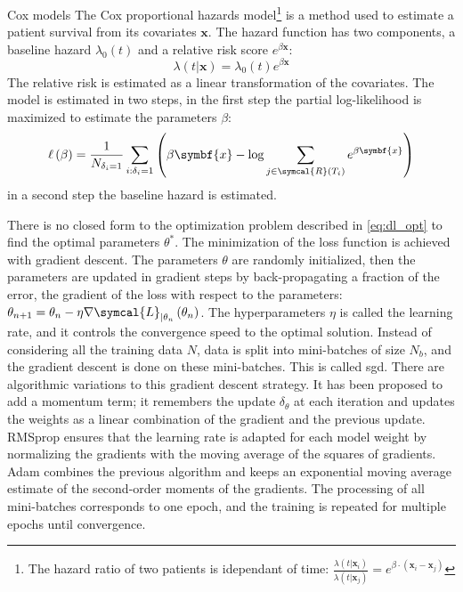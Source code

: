 \documentclass[../main.tex]{subfiles}
\begin{document}
		\begin{mybox}[label={box:cox}]{Cox models}
			The Cox proportional hazards model\footnote{The hazard ratio of two patients is idependant of time: \(\frac{\lambda(t | \symbf{x}_{i})}{\lambda(t | \symbf{x}_{j})} = e^{\beta\cdot \left(\symbf{x}_{i} - \symbf{x}_{j}\right)}\)} is a method used to estimate a patient survival from its covariates \(\symbf{x}\).
			The hazard function has two components, a baseline hazard \(\lambda_0(t)\) and a relative risk score \(e^{\beta \symbf{x}}\):
			\[\lambda(t | \symbf{x}) = \lambda_0(t) e^{\beta \symbf{x}}\]
			The relative risk is estimated as a linear transformation of the covariates.
			The model is estimated in two steps, in the first step the partial log-likelihood is maximized to estimate the parameters \(\beta\):
			\[\ell\left(\beta\right) = \frac{1}{N_{\delta_i = 1}} \sum_{i:\delta_i=1} \left(\beta \symbf{x} - \log \sum_{j \in \symcal{R}(T_i)}e^{\beta \symbf{x}} \right)\]
			in a second step the baseline hazard is estimated.
		\end{mybox}

		There is no closed form to the optimization problem described in \cref{eq:dl_opt} to find the optimal parameters \(\theta^{*}\).
		The minimization of the loss function is achieved with gradient descent.
		The parameters \(\theta\) are randomly initialized, then the parameters are updated in gradient steps by back-propagating a fraction of the error, \ie{}the gradient of the loss with respect to the parameters: \(\theta_{n+1} = \theta_{n} - \eta \nabla \symcal{L}_{|\theta_n}\left(\theta_{n}\right)\).
		The hyperparameters \(\eta\) is called the learning rate, and it controls the convergence speed to the optimal solution.
		Instead of considering all the training data \(N\), data is split into mini-batches of size \(N_b\), and the gradient descent is done on these mini-batches.
		This is called \gls{sgd}.
		There are algorithmic variations to this gradient descent strategy.
		It has been proposed to add a momentum term; it remembers the update \(\delta_{\theta}\) at each iteration and updates the weights as a linear combination of the gradient and the previous update.
		RMSprop ensures that the learning rate is adapted for each model weight by normalizing the gradients with the moving average of the squares of gradients.
		Adam combines the previous algorithm and keeps an exponential moving average estimate of the second-order moments of the gradients.
		The processing of all mini-batches corresponds to one epoch, and the training is repeated for multiple epochs until convergence.
\end{document}
